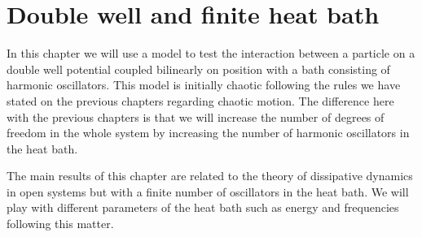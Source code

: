 \pagestyle{fancy}
\fancyhf{}
\rhead{\rightmark}
\lhead{\thepage}

\chapter{Double well and finite heat bath}

In this chapter we will use a model to test the interaction between a particle on a double well potential coupled bilinearly on position with a bath consisting of harmonic oscillators. This model is initially chaotic following the rules we have stated on the previous chapters regarding chaotic motion. The difference here with the previous chapters is that we will increase the number of degrees of freedom in the whole system by increasing the number of harmonic oscillators in the heat bath\cite{dittrich2019quantum}.\par 

The main results of this chapter are related to the theory of  dissipative dynamics in open systems but with a finite number of oscillators in the heat bath. We will play with different parameters of the heat bath such as energy and frequencies following this matter.\par 






